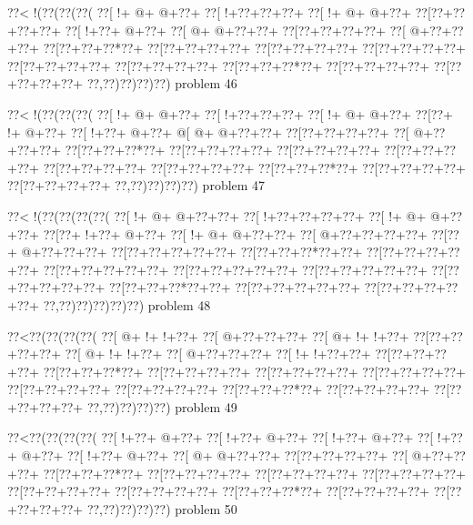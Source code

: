 \vbox{\vbox{\goo
\0??<\- !(\0??(\0??(\0??(
\0??[\- !+\- @+\- @+\0??+
\0??[\- !+\0??+\0??+\0??+
\0??[\- !+\- @+\- @+\0??+
\0??[\0??+\0??+\0??+\0??+
\0??[\- !+\0??+\- @+\0??+
\0??[\- @+\- @+\0??+\0??+
\0??[\0??+\0??+\0??+\0??+
\0??[\- @+\0??+\0??+\0??+
\0??[\0??+\0??+\0??*\0??+
\0??[\0??+\0??+\0??+\0??+
\0??[\0??+\0??+\0??+\0??+
\0??[\0??+\0??+\0??+\0??+
\0??[\0??+\0??+\0??+\0??+
\0??[\0??+\0??+\0??+\0??+
\0??[\0??+\0??+\0??*\0??+
\0??[\0??+\0??+\0??+\0??+
\0??[\0??+\0??+\0??+\0??+
\0??,\0??)\0??)\0??)\0??)
}
\hfil problem 46\hfil\break
}

\vbox{\vbox{\goo
\0??<\- !(\0??(\0??(\0??(
\0??[\- !+\- @+\- @+\0??+
\0??[\- !+\0??+\0??+\0??+
\0??[\- !+\- @+\- @+\0??+
\0??[\0??+\- !+\- @+\0??+
\0??[\- !+\0??+\- @+\0??+
\- @[\- @+\- @+\0??+\0??+
\0??[\0??+\0??+\0??+\0??+
\0??[\- @+\0??+\0??+\0??+
\0??[\0??+\0??+\0??*\0??+
\0??[\0??+\0??+\0??+\0??+
\0??[\0??+\0??+\0??+\0??+
\0??[\0??+\0??+\0??+\0??+
\0??[\0??+\0??+\0??+\0??+
\0??[\0??+\0??+\0??+\0??+
\0??[\0??+\0??+\0??*\0??+
\0??[\0??+\0??+\0??+\0??+
\0??[\0??+\0??+\0??+\0??+
\0??,\0??)\0??)\0??)\0??)
}
\hfil problem 47\hfil\break
}

\vbox{\vbox{\goo
\0??<\- !(\0??(\0??(\0??(\0??(
\0??[\- !+\- @+\- @+\0??+\0??+
\0??[\- !+\0??+\0??+\0??+\0??+
\0??[\- !+\- @+\- @+\0??+\0??+
\0??[\0??+\- !+\0??+\- @+\0??+
\0??[\- !+\- @+\- @+\0??+\0??+
\0??[\- @+\0??+\0??+\0??+\0??+
\0??[\0??+\- @+\0??+\0??+\0??+
\0??[\0??+\0??+\0??+\0??+\0??+
\0??[\0??+\0??+\0??*\0??+\0??+
\0??[\0??+\0??+\0??+\0??+\0??+
\0??[\0??+\0??+\0??+\0??+\0??+
\0??[\0??+\0??+\0??+\0??+\0??+
\0??[\0??+\0??+\0??+\0??+\0??+
\0??[\0??+\0??+\0??+\0??+\0??+
\0??[\0??+\0??+\0??*\0??+\0??+
\0??[\0??+\0??+\0??+\0??+\0??+
\0??[\0??+\0??+\0??+\0??+\0??+
\0??,\0??)\0??)\0??)\0??)\0??)
}
\hfil problem 48\hfil\break
}

\vbox{\vbox{\goo
\0??<\0??(\0??(\0??(\0??(
\0??[\- @+\- !+\- !+\0??+
\0??[\- @+\0??+\0??+\0??+
\0??[\- @+\- !+\- !+\0??+
\0??[\0??+\0??+\0??+\0??+
\0??[\- @+\- !+\- !+\0??+
\0??[\- @+\0??+\0??+\0??+
\0??[\- !+\- !+\0??+\0??+
\0??[\0??+\0??+\0??+\0??+
\0??[\0??+\0??+\0??*\0??+
\0??[\0??+\0??+\0??+\0??+
\0??[\0??+\0??+\0??+\0??+
\0??[\0??+\0??+\0??+\0??+
\0??[\0??+\0??+\0??+\0??+
\0??[\0??+\0??+\0??+\0??+
\0??[\0??+\0??+\0??*\0??+
\0??[\0??+\0??+\0??+\0??+
\0??[\0??+\0??+\0??+\0??+
\0??,\0??)\0??)\0??)\0??)
}
\hfil problem 49\hfil\break
}

\vbox{\vbox{\goo
\0??<\0??(\0??(\0??(\0??(
\0??[\- !+\0??+\- @+\0??+
\0??[\- !+\0??+\- @+\0??+
\0??[\- !+\0??+\- @+\0??+
\0??[\- !+\0??+\- @+\0??+
\0??[\- !+\0??+\- @+\0??+
\0??[\- @+\- @+\0??+\0??+
\0??[\0??+\0??+\0??+\0??+
\0??[\- @+\0??+\0??+\0??+
\0??[\0??+\0??+\0??*\0??+
\0??[\0??+\0??+\0??+\0??+
\0??[\0??+\0??+\0??+\0??+
\0??[\0??+\0??+\0??+\0??+
\0??[\0??+\0??+\0??+\0??+
\0??[\0??+\0??+\0??+\0??+
\0??[\0??+\0??+\0??*\0??+
\0??[\0??+\0??+\0??+\0??+
\0??[\0??+\0??+\0??+\0??+
\0??,\0??)\0??)\0??)\0??)
}
\hfil problem 50\hfil\break
}

